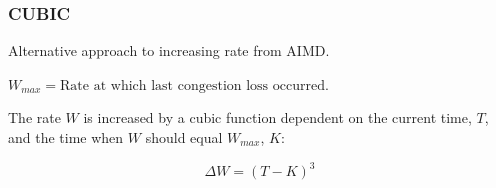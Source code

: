 \subsubsection{CUBIC}

Alternative approach to increasing rate from AIMD.

$W_{max}=\textrm{Rate at which last congestion loss occurred}$.

The rate $W$ is increased by a cubic function dependent on the current time, $T$, and the time when $W$ should equal $W_{max}$, $K$:

\begin{equation}
    \Delta W = (T-K)^3
\end{equation}